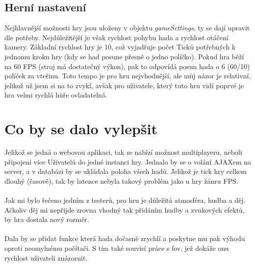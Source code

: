 \documentclass[a4paper,titlepage]{article}
\begin{document}
	\subsection{Herní nastavení}
		Nejhlavnější možnosti hry jsou uloženy v objektu \textit{gameSettings}, ty se dají upravit dle potřeby.
		Nejdůležitější je však rychlost pohybu hada a rychlost otáčení kamery.
		Základní rychlost hry je 10, což vyjadřuje počet Ticků potřebných k jednomu kroku hry
		(kdy se had posune přesně o jedno políčko).
		Pokud hra běží na 60 FPS (stroj má dostatečný výkon), pak to odpovídá posun hada o 6 (60/10) políček za vteřinu.
		Toto tempo je pro hru nejvhodnější, ale můj názor je relativní, jelikož už jsem si na to zvykl,
		avšak pro uživatele, který tuto hru vidí poprvé je hra velmi rychlá hůře ovladatelná.
	\section{Co by se dalo vylepšit}
		Jelikož se jedná o webovou aplikaci, tak se nabízí možnost multiplayeru,
		neboli připojení více Uživatelů do jedné instanci hry. Jednalo by se o volání AJAXem na server,
		a v databázi by se ukládala poloha všech hadů. Jelikož je tick hry celkem dlouhý (časově), tak by latence
		nebyla takový problém jako u hry žánru FPS.\\
		\\
		Jak mi bylo řečeno jedním z testerů, pro hru je důležitá atmosféra, hudba a děj.
		Ačkoliv děj mi nepřijde zrovna vhodný tak přidáním hudby a zvukových efektů, by hra dostala nový rozměr.\\
		\\
		Dala by se přidat funkce která hada dočasně zrychlí a poskytne mu pak výhodu oproti neomylnému počítači.
		S tím také souvisí práce s fov, jež dokáže onu rychlost uživateli znázornit.\\
		\\		
\end{document}
